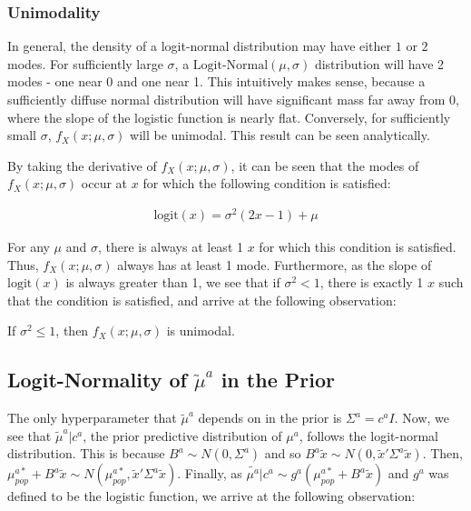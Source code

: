 \subsubsection{Unimodality}

In general, the density of a logit-normal distribution may have either $1$ or $2$ modes.  For sufficiently large $\sigma$, a $\textrm{Logit-Normal}(\mu, \sigma)$ distribution will have 2 modes - one near 0 and one near 1.  This intuitively makes sense, because a sufficiently diffuse normal distribution will have significant mass far away from 0, where the slope of the logistic function is nearly flat.  Conversely, for sufficiently small $\sigma$, $f_X(x;\mu,\sigma)$ will be unimodal.  This result can be seen analytically.

By taking the derivative of $f_X(x; \mu, \sigma)$, it can be seen that the modes of $f_X(x;\mu, \sigma)$ occur at $x$ for which the following condition is satisfied:

\begin{eqnarray}
\textrm{logit}(x) = \sigma^2(2x-1) + \mu
\end{eqnarray}

For any $\mu$ and $\sigma$, there is always at least 1 $x$ for which this condition is satisfied.  Thus, $f_X(x;\mu, \sigma)$ always has at least 1 mode.  Furthermore, as the slope of $\textrm{logit}(x)$ is always greater than 1, we see that if $\sigma^2 < 1$, there is exactly 1 $x$ such that the condition is satisfied, and arrive at the following observation:

\begin{obs}
If $\sigma^2 \leq 1$, then $f_X(x;\mu, \sigma)$ is unimodal.
\end{obs}

\subsection{Logit-Normality of $\tilde{\mu}^a$ in the Prior}
The only hyperparameter that $\tilde{\mu}^a$ depends on in the prior is $\Sigma^a=c^aI$.  Now, we see that $\tilde{\mu}^a|c^a$, the prior predictive distribution of $\mu^a$, follows the logit-normal distribution.  This is because $B^a \sim N(0, \Sigma^a)$ and so $B^a\tilde{x} \sim N(0, \tilde{x}'\Sigma^a\tilde{x})$.  Then, $\mu_{pop}^{a*} + B^a\tilde{x} \sim N(\mu_{pop}^{a*}, \tilde{x}'\Sigma^a\tilde{x})$.  Finally, as $\tilde{\mu^a}|c^a \sim g^a(\mu_{pop}^{a*} + B^a\tilde{x})$ and $g^a$ was defined to be the logistic function, we arrive at the following observation:

